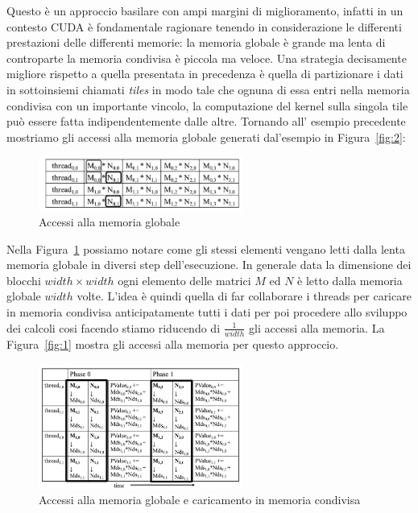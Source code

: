 \documentclass[a4paper]{article}
\begin{document}
Questo è un approccio basilare con ampi margini di miglioramento, infatti in un contesto CUDA è fondamentale ragionare tenendo in considerazione le differenti prestazioni delle differenti memorie: la memoria globale è grande ma lenta di controparte la memoria condivisa è piccola ma veloce. Una strategia decisamente migliore rispetto a quella presentata in precedenza è quella di partizionare i dati in sottoinsiemi chiamati \textit{tiles} in modo tale che ognuna di essa entri nella memoria condivisa con un importante vincolo, la computazione del kernel sulla singola tile può essere fatta indipendentemente dalle altre. Tornando all' esempio precedente mostriamo gli accessi alla memoria globale generati dal'esempio in Figura~\ref{fig:2}:

\begin{figure}[H]
    \centering
    \includegraphics[width=0.6\textwidth]{imgs/memory_access.png}
    \caption{Accessi alla memoria globale}
    \label{fig:3}
\end{figure}

Nella Figura~\ref{fig:3} possiamo notare come gli stessi elementi vengano letti dalla lenta memoria globale in diversi step dell'esecuzione. In generale data la dimensione dei blocchi $width\times{width}$ ogni elemento delle matrici $M$ ed $N$ è letto dalla memoria globale $width$ volte. L'idea è quindi quella di far collaborare i threads per caricare in memoria condivisa anticipatamente tutti i dati per poi procedere allo sviluppo dei calcoli cosi facendo stiamo riducendo di $\frac{1}{width}$ gli accessi alla memoria. La Figura~\ref{fig:1} mostra gli accessi alla memoria per questo approccio.

\begin{figure}[H]
    \centering
    \includegraphics[width=0.6\textwidth]{imgs/memory_access1.png}
    \caption{Accessi alla memoria globale e caricamento in memoria condivisa}
    \label{fig:4}
\end{figure}
\end{document}

